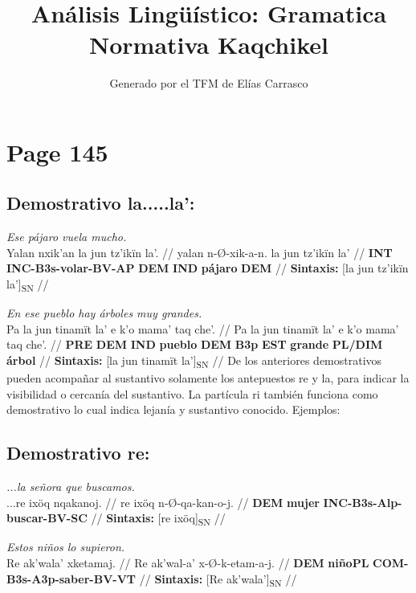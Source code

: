 \documentclass{article}%
\title{Análisis Lingüístico: Gramatica Normativa Kaqchikel}%
\author{Generado por el TFM de Elías Carrasco}%
\begin{document}
%
\normalsize%
\maketitle%
\section{Page 145}%
\label{sec:Page145}%
\subsection{Demostrativo la.....la':}%
\label{subsec:Demostrativola.....la}%

%
\par\medskip%
\ex
\textit{Ese pájaro vuela mucho.} \\
\begingl
\gla Yalan nxik'an la jun tz'ikïn la'. //
\glb yalan n-Ø-xik-a-n. la jun tz'ikïn la' //
\glc \textbf{INT} \textbf{INC-}\textbf{B3s-}\textbf{volar-}\textbf{BV-}\textbf{AP} \textbf{DEM} \textbf{IND} \textbf{pájaro} \textbf{DEM} //
\glft \textbf{Sintaxis:} [la jun tz'ikïn la']\textsubscript{SN} //
\endgl
\xe
%
\medskip%
\par\medskip%
\ex
\textit{En ese pueblo hay árboles muy grandes.} \\
\begingl
\gla Pa la jun tinamït la' e k'o mama' taq che'. //
\glb Pa la jun tinamït la' e k'o mama' taq che'. //
\glc \textbf{PRE} \textbf{DEM} \textbf{IND} \textbf{pueblo} \textbf{DEM} \textbf{B3p} \textbf{EST} \textbf{grande} \textbf{PL/DIM} \textbf{árbol} //
\glft \textbf{Sintaxis:} [la jun tinamït la']\textsubscript{SN} //
\endgl
\xe
%
\medskip%
De los anteriores demostrativos pueden acompañar al sustantivo solamente los %
antepuestos re y la, para indicar la visibilidad o cercanía del sustantivo. La partícula ri %
también funciona como demostrativo lo cual indica lejanía y sustantivo conocido. %
Ejemplos: %
\subsection{Demostrativo re:}%
\label{subsec:Demostrativore}%

%
\par\medskip%
\ex
\textit{...la señora que buscamos.} \\
\begingl
\gla ...re ixöq nqakanoj. //
\glb re ixöq n-Ø-qa-kan-o-j. //
\glc \textbf{DEM} \textbf{mujer} \textbf{INC-}\textbf{B3s-}\textbf{Alp-}\textbf{buscar-}\textbf{BV-}\textbf{SC} //
\glft \textbf{Sintaxis:} [re ixöq]\textsubscript{SN} //
\endgl
\xe
%
\medskip%
\par\medskip%
\ex
\textit{Estos niños lo supieron.} \\
\begingl
\gla Re ak'wala' xketamaj. //
\glb Re ak'wal-a' x-Ø-k-etam-a-j. //
\glc \textbf{DEM} \textbf{niño}\textbf{PL} \textbf{COM-}\textbf{B3s-}\textbf{A3p-}\textbf{saber-}\textbf{BV-}\textbf{VT} //
\glft \textbf{Sintaxis:} [Re ak'wala']\textsubscript{SN} //
\endgl
\xe
%
\medskip%
\end{document}
